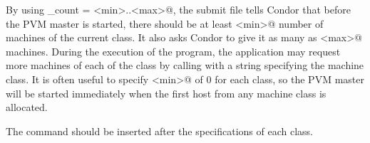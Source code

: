 By using \verb@machine_count = <min>..<max>@, the submit file tells
Condor that before the PVM master is started, there should be at least
\verb@<min>@ 
number of machines of the current class.  It also asks Condor to give
it as many as \verb@<max>@ machines.  During the execution of the program,
the application may request more machines of each of the class by calling
 with a string specifying the machine
class.
It is often useful to specify \verb@<min>@ of 0 for each
class, so the PVM master will be started immediately when the first
host from any machine class is allocated.

The  command should be inserted after the specifications of
each class.

